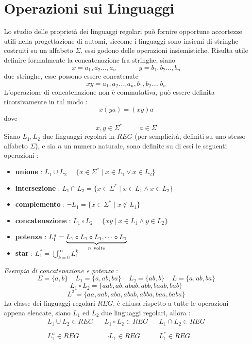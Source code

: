 \documentclass[10pt, letterpaper]{report}
\begin{document}
\section{Operazioni sui Linguaggi}
Lo studio delle proprietà dei linguaggi regolari può fornire opportune accortezze
utili nella progettazione di automi, siccome i linguaggi sono insiemi di stringhe costruiti 
su un alfabeto $\Sigma$, essi godono delle operazioni insiemistiche.\acc
Risulta utile definire formalmente la concatenazione fra stringhe, siano 
$$ x = a_1,a_2\dots,a_n\;\;\;\;\;\;\;\;\;\;\;\;y = b_1,b_2\dots,b_n $$
due stringhe, esse possono essere concatenate 
$$xy=  a_1,a_2\dots,a_n,b_1,b_2\dots,b_n $$
L'operazione di concatenazione non è commutativa, può essere definita ricorsivamente in tal 
modo : 
$$ x(ya) = (xy)a$$ 
dove 
$$x,y\in \Sigma^*\;\;\;\;\;\;\;\;\;a\in \Sigma$$
Siano $L_1,L_2$ due 
linguaggi regolari in $REG$ (per semplicità, definiti su uno stesso alfabeto $\Sigma$), e 
sia $n$ un numero naturale, sono 
definite su di essi le seguenti operazioni : \begin{itemize}
    \item \textbf{unione} : $L_1\cup L_2 = \{x\in\Sigma^*\;|\;x\in L_1\lor x\in L_2\}$
    \item \textbf{intersezione} : $L_1\cap L_2 = \{x\in\Sigma^*\;|\;x\in L_1\land x\in L_2\}$
    \item \textbf{complemento} : $\lnot L_1=\{x\in\Sigma^*\;|\;x\notin L_1\}$
    \item \textbf{concatenazione} : $L_1 \circ L_2 = \{xy\;|\;x\in L_1\land y\in L_2\}$
    \item \textbf{potenza} : $L_1^n = \smash{\underbrace{L_1\circ L_1\circ L_1,\dots\circ L_1}_{n\ \text{volte}}}\vphantom{1}$
    \item \textbf{star} : $L_1^* = \displaystyle\bigcup_{k=0}^\infty L_1^k $
\end{itemize}
\textit{Esempio di concatenazione e potenza} : 
$$\Sigma= \{a,b\}\;\;\;\; L_1 = \{a,ab,ba\}\;\;\;\; L_2 = \{ab,b\}\;\;\;\; L = \{a,ab,ba\}$$
$$L_1\circ L_2 = \{aab,ab,abab,abb,baab,bab\} $$
$$ L^2=\{aa,aab,aba,abab,abba,baa,baba\}$$
 La classe dei linguaggi regolari $REG$, è chiusa rispetto a tutte le 
operazioni appena elencate, siano $L_1$ ed $L_2$ due linguaggi regolari, allora :
$$\begin{matrix}
    L_1\cup L_2 \in REG && L_1\circ L_2 \in REG &&
    L_1\cap L_2 \in REG \\ \\ L_1^n \in REG &&
    \lnot L_1 \in REG && L_1^* \in REG
\end{matrix}$$
\end{document}
